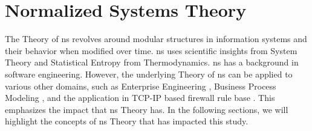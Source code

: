\section{Normalized Systems Theory} \label{sec_ns_theory}

The Theory of \gls{ns} revolves around modular structures in information systems and their
behavior when modified over time. \gls{ns} uses scientific insights from System Theory and
Statistical Entropy from Thermodynamics. \gls{ns} has a background in software
engineering. However, the underlying Theory of \gls{ns} can be applied to various other
domains, such as Enterprise Engineering \parencite{huysmans_towards_2013}, Business
Process Modeling \parencite{van_nuel_towards_2011}, and the application in TCP-IP based
firewall rule base \parencite{haerens_evolvability_2021}. This emphasizes the impact that
\gls{ns} Theory has. In the following sections, we will highlight the concepts of
\gls{ns} Theory that has impacted this study.





